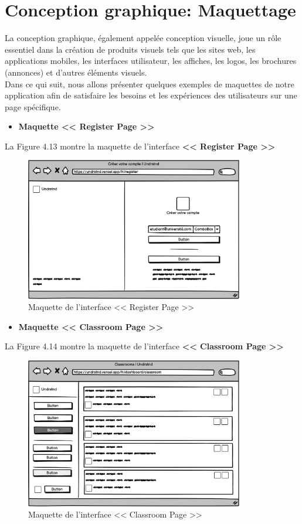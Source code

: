 \section{Conception graphique: Maquettage}
\justifying
La conception graphique, également appelée conception visuelle, joue un rôle essentiel dans la création de produits visuels tels que les sites web, les applications mobiles, les interfaces utilisateur, les affiches, les logos, les brochures (annonces) et d'autres éléments visuels.\\
Dans ce qui suit, nous allons présenter quelques exemples de maquettes de notre application afin de satisfaire les besoins et les expériences des utilisateurs sur une page spécifique.
\begin{itemize}
    \item \textbf{Maquette << Register Page >>}
\end{itemize}
La Figure 4.13 montre la maquette de l’interface \textbf{<< Register Page >>}
\begin{figure}[H]
    \centering
    \includegraphics[width=0.85\textwidth,height=0.4\textwidth]{images/chp4/fig13.png}
    \caption{Maquette de l’interface << Register Page >>}
    \label{fig:Maquette de l’interface <<Register Page>>}    
\end{figure}
\begin{itemize}
    \item \textbf{Maquette << Classroom Page >>}
\end{itemize}
La Figure 4.14 montre la maquette de l’interface \textbf{<< Classroom Page >>}
\begin{figure}[H]
    \centering
    \includegraphics[width=0.85\textwidth,height=0.4\textwidth]{images/chp4/fig14.png}
    \caption{Maquette de l’interface << Classroom Page >>}
    \label{fig:Maquette de l’interface <<Classroom Page>>}    
\end{figure}
